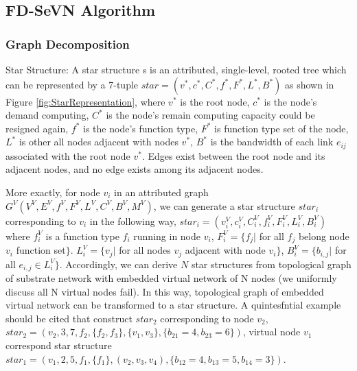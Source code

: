 \subsection{FD-SeVN Algorithm}
\subsubsection{Graph Decomposition}
Star Structure: A star structure s is an attributed, single-level, rooted tree which can be represented by a 7-tuple $star=(v^*,c^*,C^*,f^*,F^*,L^*,B^*)$ as shown in Figure \ref{fig:StarRepresentation}, where $v^*$ is the root node, $c^*$ is the  node's demand computing, $C^*$ is the node's remain computing capacity could be resigned again, $f^*$ is the node's function type, $F^*$ is function type set of the node, $L^*$ is other all nodes  adjacent with nodes $v^*$, $B^*$ is the bandwidth of each link $e_{ij}$ associated with the root node $v^*$. Edges exist between the root node and its adjacent nodes, and no edge exists among its adjacent nodes.

More exactly, for node $v_i$ in an attributed graph  $G^V (V^V,E^V,f^V,F^V,L^V,C^V,B^V,M^V)$, we can generate a star structure $star_i$ corresponding to $v_i$ in the following way, $star_i=(v^V_i,c^V_i,C^V_i,f^V_i,F^V_i,L^V_i,B^V_i)$ where $f^V_i$ is a function type $f_i$ running in node $v_i$, $F^V_i=\{f_{j}|$ for all $f_j$ belong node $v_i$ function set$\}$.  $L^V_i=\{v_j|$ for all nodes $v_j$  adjacent with node $v_i\}$, $B^V_i=\{b_{i,j}| $ for all $e_{i,j}\in L^V_i\}$. Accordingly, we can derive $N$ star structures from topological graph of substrate network with embedded virtual network of N nodes (we uniformly discuss all N virtual nodes fail). In this way, topological graph of embedded virtual network can be transformed to a  star structure. A quintesfntial example should be cited that construct $star_2$ corresponding to node $v_2$, $star_2=(v_2,3,7,f_2,\{f_2,f_3\},\{v_1,v_3\},\{b_{21}=4,b_{23}=6\})$, virtual node $v_1$ correspond star structure $star_1=(v_1,2,5,f_1,\{f_1\},(v_2,v_3,v_4),\{b_{12}=4,b_{13}=5,b_{14}=3\})$.

